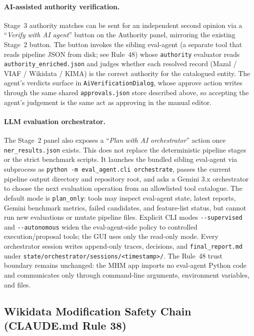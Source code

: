 \documentclass[12pt]{article}
\newcommand{\code}[1]{\texttt{#1}}
\begin{document}
\paragraph{AI-assisted authority verification.}
Stage~3 authority matches can be sent for an independent second opinion via a ``\emph{Verify with AI agent}'' button on the Authority panel, mirroring the existing Stage~2 button. The button invokes the sibling eval-agent (a separate tool that reads pipeline JSON from disk; see Rule~48) whose \code{authority} evaluator reads \code{authority\_enriched.json} and judges whether each resolved record (Mazal / VIAF / Wikidata / KIMA) is the correct authority for the catalogued entity. The agent's verdicts surface in \code{AiVerificationDialog}, whose approve action writes through the same shared \code{approvals.json} store described above, so accepting the agent's judgement is the same act as approving in the manual editor.

\paragraph{LLM evaluation orchestrator.}
The Stage~2 panel also exposes a ``\emph{Plan with AI orchestrator}'' action once \code{ner\_results.json} exists. This does not replace the deterministic pipeline stages or the strict benchmark scripts. It launches the bundled sibling eval-agent via subprocess as \code{python -m eval\_agent.cli orchestrate}, passes the current pipeline output directory and repository root, and asks a Gemini 3.x orchestrator to choose the next evaluation operation from an allowlisted tool catalogue. The default mode is \code{plan\_only}: tools may inspect eval-agent state, latest reports, Gemini benchmark metrics, failed candidates, and feature-list status, but cannot run new evaluations or mutate pipeline files. Explicit CLI modes \code{-{}-supervised} and \code{-{}-autonomous} widen the eval-agent-side policy to controlled execution/proposal tools; the GUI uses only the read-only mode. Every orchestrator session writes append-only traces, decisions, and \code{final\_report.md} under \code{state/orchestrator/sessions/<timestamp>/}. The Rule~48 trust boundary remains unchanged: the MHM app imports no eval-agent Python code and communicates only through command-line arguments, environment variables, and files.

\subsection{Wikidata Modification Safety Chain (CLAUDE.md Rule 38)}
\label{sec:rule38}
\end{document}

